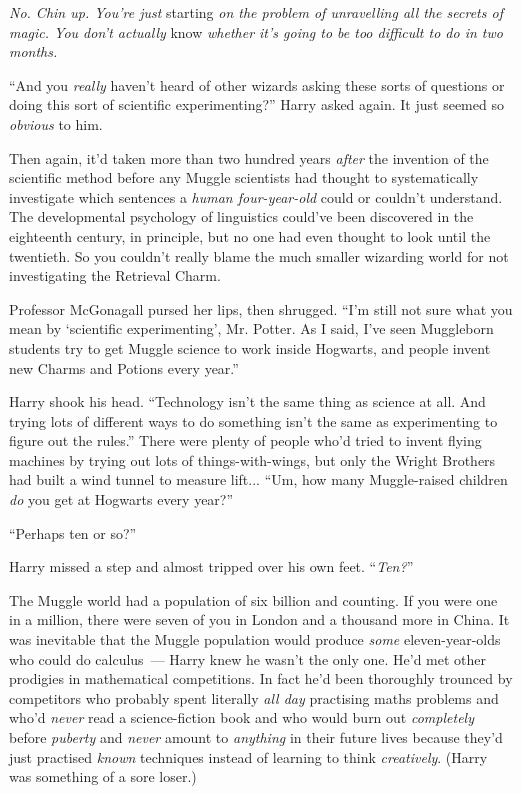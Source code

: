 \emph{No. Chin up. You're just} starting \emph{on the problem of unravelling all the secrets of magic. You don't actually} know \emph{whether it's going to be too difficult to do in two months.}

``And you \emph{really} haven't heard of other wizards asking these sorts of questions or doing this sort of scientific experimenting?'' Harry asked again. It just seemed so \emph{obvious} to him.

Then again, it'd taken more than two hundred years \emph{after} the invention of the scientific method before any Muggle scientists had thought to systematically investigate which sentences a \emph{human four-year-old} could or couldn't understand. The developmental psychology of linguistics could've been discovered in the eighteenth century, in principle, but no one had even thought to look until the twentieth. So you couldn't really blame the much smaller wizarding world for not investigating the Retrieval Charm.

Professor McGonagall pursed her lips, then shrugged. ``I'm still not sure what you mean by `scientific experimenting', Mr. Potter. As I said, I've seen Muggleborn students try to get Muggle science to work inside Hogwarts, and people invent new Charms and Potions every year.''

Harry shook his head. ``Technology isn't the same thing as science at all. And trying lots of different ways to do something isn't the same as experimenting to figure out the rules.'' There were plenty of people who'd tried to invent flying machines by trying out lots of things-with-wings, but only the Wright Brothers had built a wind tunnel to measure lift... ``Um, how many Muggle-raised children \emph{do} you get at Hogwarts every year?''

``Perhaps ten or so?''

Harry missed a step and almost tripped over his own feet. ``\emph{Ten?}''

The Muggle world had a population of six billion and counting. If you were one in a million, there were seven of you in London and a thousand more in China. It was inevitable that the Muggle population would produce \emph{some} eleven-year-olds who could do calculus~--- Harry knew he wasn't the only one. He'd met other prodigies in mathematical competitions. In fact he'd been thoroughly trounced by competitors who probably spent literally \emph{all day} practising maths problems and who'd \emph{never} read a science-fiction book and who would burn out \emph{completely} before \emph{puberty} and \emph{never} amount to \emph{anything} in their future lives because they'd just practised \emph{known} techniques instead of learning to think \emph{creatively}. (Harry was something of a sore loser.)

